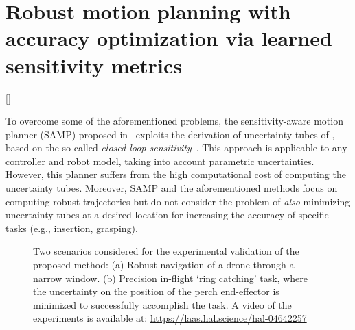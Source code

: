 \chapter{Robust motion planning with accuracy optimization via learned sensitivity metrics}[]\label{chap:sampNN}

To overcome some of the aforementioned problems, the sensitivity-aware motion planner (SAMP) proposed in~\cite{cSAMP} exploits the derivation of uncertainty tubes of \cite{cTube}, based on the so-called \emph{closed-loop sensitivity}~\cite{cPi,cTh}.
This approach is applicable to any controller and robot model, taking into account parametric uncertainties. 
However, this planner suffers from the high computational cost of computing the uncertainty tubes.
Moreover, SAMP and the aforementioned methods focus on computing robust trajectories but do not consider the problem of \emph{also} minimizing uncertainty tubes at a desired location for increasing the accuracy of specific tasks (e.g., insertion, grasping).

\begin{figure} [t]
    \centering
    \caption{
    Two scenarios considered for the experimental validation of the proposed method:
    (a) Robust navigation of a drone through a narrow window. (b) Precision in-flight `ring catching' task, where the uncertainty on the position of the perch end-effector is minimized to successfully accomplish the task.
    A video of the experiments is available at: \href{https://laas.hal.science/hal-04642257}{https://laas.hal.science/hal-04642257}}%
    \label{fig: Missed and succes}%
\end{figure}

